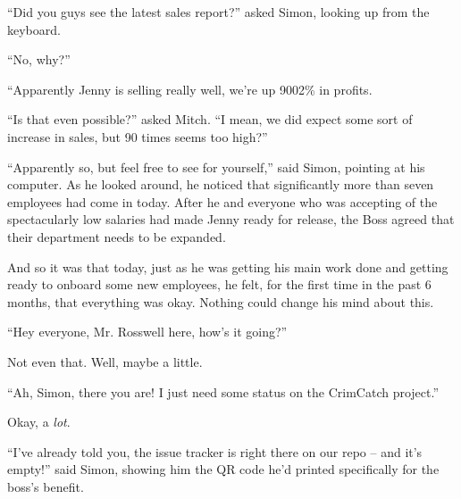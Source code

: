 \documentclass[10pt,a4paper]{article}
\newcommand{\lang}[2]{ #2 \par}
\newcommand{\ainame}{Jenny}
\newcommand{\mainname}{Simon}
\newcommand{\auxname}{Mitch}
\newcommand{\ceoname}{Mr. Rosswell}
\newcommand{\featurename}{CrimCatch}
\begin{document}
\lang{-- Ребята, а вы видели последний отчёт по продажам? -- спросил \mainname{}, подняв глаза с клавиатуры.}{``Did you guys see the latest sales report?'' asked \mainname{}, looking up from the keyboard.}
\lang{-- Нет, а что?}{``No, why?''}
\lang{-- По всей видимости, \ainame{} очень хорошо продается, прибыль поднялась на 9002\%.}{``Apparently \ainame{} is selling really well, we're up 9002\% in profits.}
\lang{-- А это вообще возможно? -- спросил \auxname{}. -- Конечно, мы ожидали каких-то улучшений, но в 90 раз -- как-то многовато...}{``Is that even possible?'' asked \auxname{}. ``I mean, we did expect some sort of increase in sales, but 90 times seems too high?''}
\lang{-- Так оно и есть, но ты сам взгляни, -- сказал \mainname{}, указывая на свой монитор. Оглянувшись вокруг, он заметил, что сегодня пришло значительно больше семи человек. После того, как он и все, кто был согласен на потрясающе низкие зарплаты, смогли-таки подготовить \ainame{} к выпуску, их начальник согласился, что их отдел надо значительно расширять.}{``Apparently so, but feel free to see for yourself,'' said \mainname{}, pointing at his computer. As he looked around, he noticed that significantly more than seven employees had come in today. After he and everyone who was accepting of the spectacularly low salaries had made \ainame{} ready for release, the Boss agreed that their department needs to be expanded.}
\lang{И вот, заканчивая свою основную работу и готовясь обучить новых сотрудников, он почувствовал, в первый раз за полгода, что всё было хорошо. И ничего не могло бы заставить его передумать.}{And so it was that today, just as he was getting his main work done and getting ready to onboard some new employees, he felt, for the first time in the past 6 months, that everything was okay. Nothing could change his mind about this.}
\lang{-- Всем привет, это \ceoname{}, как тут у всех дела?}{``Hey everyone, \ceoname{} here, how's it going?''}
\lang{Даже это. Ну ладно, ну может чуть-чуть.}{Not even that. Well, maybe a little.}
\lang{-- А, \mainname{}, вот ты где! Мне тут нужно знать, как продвигается проект \featurename{}.}{``Ah, \mainname{}, there you are! I just need some status on the \featurename{} project.''}
\lang{Ладно, \emph{сильно} передумать.}{Okay, a \emph{lot}.}
\lang{-- Я же уже говорил вам, трекер задач там прямо в репозитории, а там пусто! -- сказал \mainname{}, показывая ему QR-код, распечатанный специально для таких, как он.}{``I've already told you, the issue tracker is right there on our repo -- and it's empty!'' said \mainname{}, showing him the QR code he'd printed specifically for the boss's benefit.}
\end{document}
